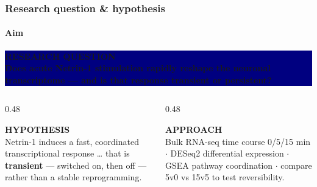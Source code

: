 \documentclass[aspectratio=169,11pt]{beamer}
\newcommand{\tl}[1]{\textcolor{teald}{\textbf{#1}}}
\begin{document}
\begin{frame}
  \frametitle{Research question \& hypothesis}\framesubtitle{Aim}
  \begin{beamercolorbox}[wd=\textwidth,sep=8pt]{}
  \colorbox{navy}{\parbox{0.97\textwidth}{\color{white}
    {\color{teal!60!white}\footnotesize\bfseries RESEARCH QUESTION}\\[3pt]
    \large\bfseries Does acute Netrin-1 stimulation rapidly reshape the neuronal
    transcriptome --- and is that response transient or persistent?}}
  \end{beamercolorbox}
  \vskip8pt
  \begin{columns}[T]
    \begin{column}{0.48\textwidth}
      \colorbox{lbg}{\parbox{\textwidth}{\vskip2pt
        {\color{teal}\scriptsize\bfseries HYPOTHESIS}\\[4pt]
        \small Netrin-1 induces a fast, coordinated transcriptional response \ldots
        that is \tl{transient} --- switched on, then off --- rather than a stable
        reprogramming.\vskip3pt}}
    \end{column}
    \begin{column}{0.48\textwidth}
      \colorbox{abg}{\parbox{\textwidth}{\vskip2pt
        {\color{teald}\scriptsize\bfseries APPROACH}\\[4pt]
        \small Bulk RNA-seq time course 0/5/15 min $\cdot$ DESeq2 differential
        expression $\cdot$ GSEA pathway coordination $\cdot$ compare 5v0 vs 15v5 to
        test reversibility.\vskip3pt}}
    \end{column}
  \end{columns}
\end{frame}
\end{document}
